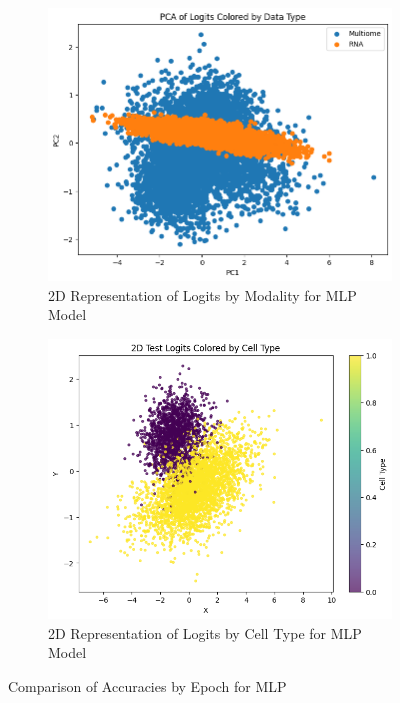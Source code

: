 \documentclass[11pt,a4paper]{article}
\begin{document}
\begin{figure}[H]
    \centering
    \begin{subfigure}[b]{0.45\linewidth}
        \centering
        \includegraphics[width=\linewidth]{PCAofTestLogits.png}
        \caption{2D Representation of Logits by Modality for MLP Model}
        \label{fig:figure7}
    \end{subfigure}
    \hfill
    \begin{subfigure}[b]{0.45\linewidth}
        \centering
        \includegraphics[width=\linewidth]{MLPTestLogitsColoredByCellType.png}
        \caption{2D Representation of Logits by Cell Type for MLP Model}
        \label{fig:figure12}
    \end{subfigure}

    \caption{Comparison of Accuracies by Epoch for MLP}
    \label{fig:comparison}
\end{figure}
\end{document}
